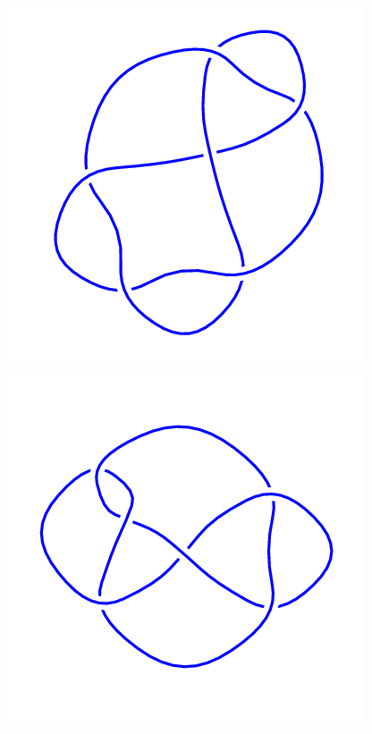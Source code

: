 \begin{figure}[H]
    \begin{minipage}[b]{.18\linewidth}
        \centering
        \includegraphics[width=\linewidth]{../data/6_2.png}
    \end{minipage}
    \begin{minipage}[b]{.18\linewidth}
        \centering
        \includegraphics[width=\linewidth]{../data/6_3.png}

\end{minipage}
\end{figure}
